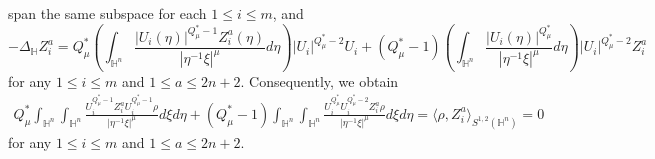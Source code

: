 \documentclass[11pt]{article}
\begin{document}
span the same subspace for each \( 1\leq i\leq m \), and
\begin{equation*}
	-\Delta_{\mathbb{H}} Z_i^a=Q^{\ast}_{\mu}\left(\int_{\mathbb{H}^{n}}\frac{|U_i(\eta)|^{Q^{\ast}_{\mu}-1}Z_i^a(\eta)}
{|\eta^{-1}\xi|^{\mu}}{d}\eta\right)|U_i|^{Q^{\ast}_{\mu}-2}U_i+(Q^{\ast}_{\mu}-1)
\left(\int_{\mathbb{H}^{n}}\frac{|U_i(\eta)|^{Q^{\ast}_{\mu}}}{|\eta^{-1}\xi|^{\mu}}{d}\eta\right)
|U_i|^{Q^{\ast}_{\mu}-2}Z_i^a
\end{equation*}
for any $1\leq i\leq m$ and $1\leq a\leq 2n+2$.
Consequently, we obtain
\begin{align}\label{orth}
Q^{\ast}_{\mu}\int_{\mathbb{H}^{n}}\int_{\mathbb{H}^{n}}\frac{U_i^{Q^{\ast}_{\mu}-1}Z_i^aU_i^{Q^{\ast}_{\mu}-1}\rho}
{|\eta^{-1}\xi|^{\mu}}d \xi{d}\eta +(Q^{\ast}_{\mu}-1)
\int_{\mathbb{H}^{n}}\int_{\mathbb{H}^{n}}\frac{U_i^{Q^{\ast}_{\mu}}U_i^{Q^{\ast}_{\mu}-2}Z_i^a\rho}
{|\eta^{-1}\xi|^{\mu}}d\xi{d}\eta=\langle \rho, Z_i^a \rangle_{S^{1,2}(\mathbb{H}^{n})}= 0
\end{align}
for any $1\leq i\leq m$ and $1\leq a\leq 2n+2$.
\end{document}
